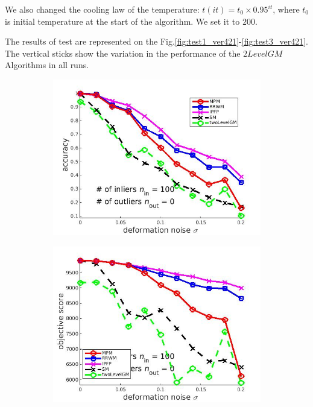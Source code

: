 \documentclass[
	fontsize=12pt,
	paper=a4,
	twoside=false,
	numbers=noenddot,
	plainheadsepline,
	toc=listof,
	toc=bibliography
]{scrartcl}
\begin{document}
We also changed the cooling law of the temperature: $t(it) = t_0\times 0.95^{it}$, where $t_0$ is initial temperature at the start of the algorithm. We set it to $200$.  

The  results of test are represented on the Fig.\ref{fig:test1_ver421}-\ref{fig:test3_ver421}. The vertical sticks show the variation in the performance of the $2LevelGM$ Algorithms in all runs.

\begin{figure}[h] 
	\begin{subfigure}[b]{0.3\textwidth}
		\centering
		\includegraphics[scale=0.25]{"fig_ver2608/syntheticPointSets/ver4.2.1/deformation/accuracy_avg10t"} 
	\end{subfigure}%
	\begin{subfigure}[b]{0.3\textwidth}
		\centering
		\includegraphics[scale=0.25]{"fig_ver2608/syntheticPointSets/ver4.2.1/deformation/score_avg10t"} 

\end{subfigure}
\end{figure}
\end{document}
